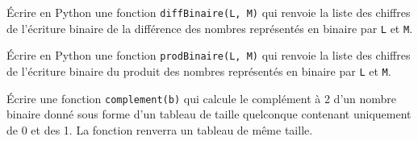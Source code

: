 \exercice{}

\'Ecrire en Python une fonction \verb+diffBinaire(L, M)+ qui renvoie la liste des chiffres de l'écriture binaire de la différence des nombres représentés en binaire par \verb+L+ et \verb+M+. 

\exercice{}

\'Ecrire en Python une fonction \verb+prodBinaire(L, M)+ qui renvoie la liste des chiffres de l'écriture binaire du produit des nombres représentés en binaire par \verb+L+ et \verb+M+. 

\exercice{}

\'Ecrire une fonction \verb!complement(b)! qui calcule le complément à 2 d'un nombre binaire donné sous forme d'un tableau de taille quelconque contenant uniquement de 0 et des 1. La fonction renverra un tableau de même taille.

  





